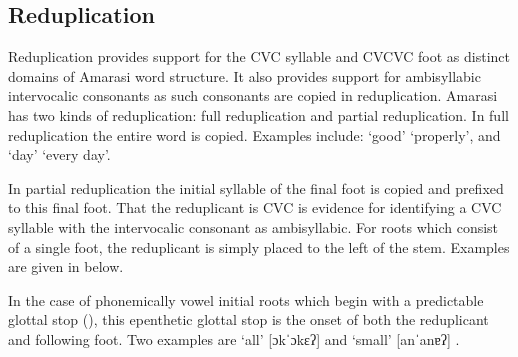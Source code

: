 \subsection{Reduplication}\label{sec:Red}
Reduplication provides support for
the CVC syllable and CVCVC foot as distinct domains of Amarasi word structure.
It also provides support for ambisyllabic intervocalic consonants
as such consonants are copied in reduplication.
Amarasi has two kinds of reduplication: full reduplication and partial reduplication.
In full reduplication the entire word is copied.
Examples include:  `good' {\ra}  `properly',
and  `day' {\ra}  `every day'.

In partial reduplication the initial
syllable of the final foot is copied and prefixed to this final foot.
That the reduplicant is CVC is evidence for identifying a CVC syllable
with the intervocalic consonant as ambisyllabic.
For roots which consist of a single foot,
the reduplicant is simply placed to the left of the stem.
Examples are given in  below.

\begin{exe}
	\label{ex:ParRed}
\end{exe}

In the case of phonemically vowel initial roots
which begin with a predictable glottal stop (),
this epenthetic glottal stop is the onset of both the reduplicant and following foot.
Two examples are  `all' {\ra}
[ɔkˈɔkɛʔ] {}
and  `small' {\ra} [anˈanɐʔ] {}.

